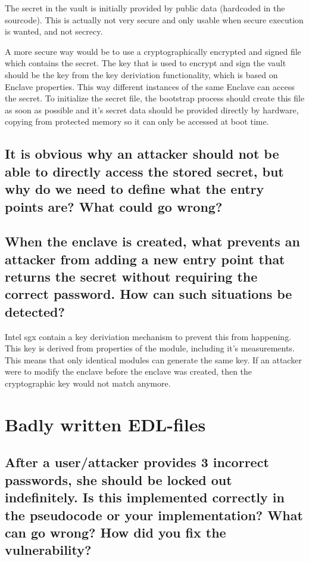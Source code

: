 \documentclass{article}
\begin{document}
The secret in the vault is initially provided by public data (hardcoded in the
sourcode). This is actually
not very secure and only usable when secure execution is wanted, and not
secrecy.

A more secure way would be to use a cryptographically encrypted and signed file
which contains the secret. The key that is used to encrypt and sign the vault
should be the key from the key deriviation functionality, which is based on
Enclave properties. This way different instances of the same Enclave can access
the secret.
To initialize the secret file, the bootstrap process should create this file as soon
as possible and it's secret data should be provided directly by hardware,
copying from protected memory so it can only be accessed at boot time.


\subsection{It is obvious why an attacker should not be able to directly access the
stored secret, but why do we need to define what the entry points are?
What could go wrong?}


\subsection{When the enclave is created, what prevents an attacker from adding a new
entry point that returns the secret
without
requiring the correct password.
How can such situations be detected?}

Intel sgx contain a key deriviation mechanism to prevent this from happening.
This key is derived from properties of the module, including it's measurements.
This means that only identical modules can generate the same key. If an attacker
were to modify the enclave before the enclave was created, then the
cryptographic key would not match anymore.

\section{Badly written EDL-files}
\subsection{After a user/attacker provides 3 incorrect passwords, she should be locked
  out indefinitely.  Is this implemented correctly in the pseudocode or your
implementation?  What can go wrong?  How did you fix the vulnerability?}
\end{document}
